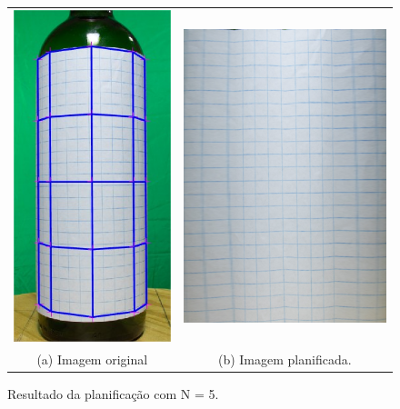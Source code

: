 \begin{figure}[ht]
    \caption{Resultado da planificação com N = 5.}     
    \centering
    \vspace{0.3cm}
    \begin{minipage}{.5\textwidth}
      \centering
            \begin{tabular}{cc}
            \includegraphics[width=.4\linewidth]{TCC/Imagens/ensaios/a_55.jpg} 
            &
            \includegraphics[width=.55\linewidth]{TCC/Imagens/ensaios/b_55.png}
            \\
            (a) Imagem original & (b) Imagem planificada.
            \end{tabular}
	\end{minipage}
    \label{fig:ensaio_2_55a}
\end{figure}

